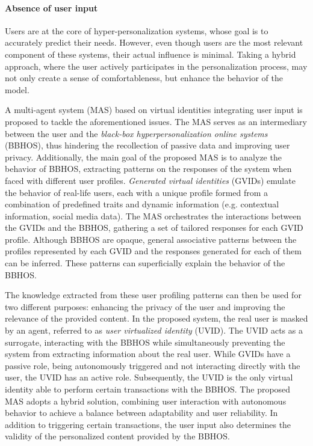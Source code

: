 \paragraph{Absence of user input}
Users are at the core of hyper-personalization systems, whose goal is to accurately predict their needs. However, even though users are the most relevant component of these systems, their actual influence is minimal. Taking a hybrid approach, where the user actively participates in the personalization process, may not only create a sense of comfortableness, but enhance the behavior of the model.

A multi-agent system (MAS) based on virtual identities integrating user input is proposed to tackle the aforementioned issues. The MAS serves as an intermediary between the user and the \textit{black-box hyperpersonalization online systems} (BBHOS), thus hindering the recollection of passive data and improving user privacy. Additionally, the main goal of the proposed MAS is to analyze the behavior of BBHOS, extracting patterns on the responses of the system when faced with different user profiles. \textit{Generated virtual identities} (GVIDs) emulate the behavior of real-life users, each with a unique profile formed from a combination of predefined traits and dynamic information (e.g. contextual information, social media data). The MAS orchestrates the interactions between the GVIDs and the BBHOS, gathering a set of tailored responses for each GVID profile. Although BBHOS are opaque, general associative patterns between the profiles represented by each GVID and the responses generated for each of them can be inferred. These patterns can superficially explain the behavior of the BBHOS.

The knowledge extracted from these user profiling patterns can then be used for two different purposes: enhancing the privacy of the user and improving the relevance of the provided content. In the proposed system, the real user is masked by an agent, referred to as \textit{user virtualized identity} (UVID). The UVID acts as a surrogate, interacting with the BBHOS while simultaneously preventing the system from extracting information about the real user. While GVIDs have a passive role, being autonomously triggered and not interacting directly with the user, the UVID has an active role. Subsequently, the UVID is the only virtual identity able to perform certain transactions with the BBHOS. The proposed MAS adopts a hybrid solution, combining user interaction with autonomous behavior to achieve a balance between adaptability and user reliability. In addition to triggering certain transactions, the user input also determines the validity of the personalized content provided by the BBHOS.

